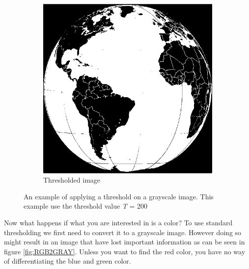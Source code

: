 \begin{figure}
\begin{subfigure}[b]{0.3\textwidth}
                \includegraphics[scale = 0.2]{img/post_threshold}
                \caption{Thresholded image}
        \end{subfigure}
		\caption{An example of applying a threshold on a grayscale image. This example use the threshold value \textit{T} = 200}
		\label{fig:threshold_example}
\end{figure}

Now what happens if what you are interested in is a color? To use standard thresholding we first need to convert it to a grayscale image. However doing so might result in an image that have lost important information as can be seen in figure \ref{fig:RGB2GRAY}. Unless you want to find the red color, you have no way of differentiating the blue and green color.

